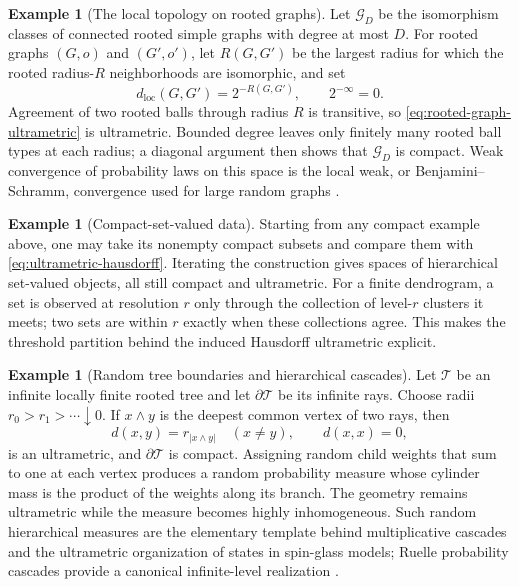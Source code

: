 \documentclass[11pt,a4paper]{article}
\theoremstyle{definition}
\newtheorem{example}[theorem]{Example}
\theoremstyle{remark}
\begin{document}
\begin{example}[The local topology on rooted graphs]
\label{ex:rooted-graph-ultrametric}
Let \(\mathscr G_D\) be the isomorphism classes of connected rooted simple
graphs with degree at most \(D\).  For rooted graphs \((G,o)\) and
\((G',o')\), let
\(R(G,G')\) be the largest radius for which the rooted radius-\(R\)
neighborhoods are isomorphic, and set
\begin{equation}
  d_{\mathrm{loc}}(G,G')=2^{-R(G,G')},
  \qquad 2^{-\infty}=0.
  \label{eq:rooted-graph-ultrametric}
\end{equation}
Agreement of two rooted balls through radius \(R\) is transitive, so
\eqref{eq:rooted-graph-ultrametric} is ultrametric.  Bounded degree leaves
only finitely many rooted ball types at each radius; a diagonal argument then
shows that \(\mathscr G_D\) is compact.  Weak convergence of probability laws
on this space is the local weak, or Benjamini--Schramm, convergence used for
large random graphs \citep{BenjaminiSchramm2001}.
\end{example}

\begin{example}[Compact-set-valued data]
\label{ex:hyperspace-ultrametric}
Starting from any compact example above, one may take its nonempty compact
subsets and compare them with \eqref{eq:ultrametric-hausdorff}.  Iterating the
construction gives spaces of hierarchical set-valued objects, all still
compact and ultrametric.  For a finite dendrogram, a set is observed at
resolution \(r\) only through the collection of level-\(r\) clusters it
meets; two sets are within \(r\) exactly when these collections agree.  This
makes the threshold partition behind the induced Hausdorff ultrametric
explicit.
\end{example}

\begin{example}[Random tree boundaries and hierarchical cascades]
\label{ex:random-cascade-ultrametric}
Let \(\mathcal T\) be an infinite locally finite rooted tree and let
\(\partial\mathcal T\) be its infinite rays.  Choose radii
\(r_0>r_1>\cdots\downarrow0\).  If \(x\wedge y\) is the deepest common vertex
of two rays, then
\[
  d(x,y)=r_{\lvert x\wedge y\rvert}\quad(x\neq y),
  \qquad d(x,x)=0,
\]
is an ultrametric, and \(\partial\mathcal T\) is compact.  Assigning random
child weights that sum to one at each vertex produces a random probability
measure whose cylinder mass is the product of the weights along its branch.
The geometry remains ultrametric while the measure becomes highly
inhomogeneous.  Such random hierarchical measures are the elementary
template behind multiplicative cascades and the ultrametric organization of
states in spin-glass models; Ruelle probability cascades provide a canonical
infinite-level realization \citep{RammalToulouseVirasoro1986,Ruelle1987}.
\end{example}
\end{document}
